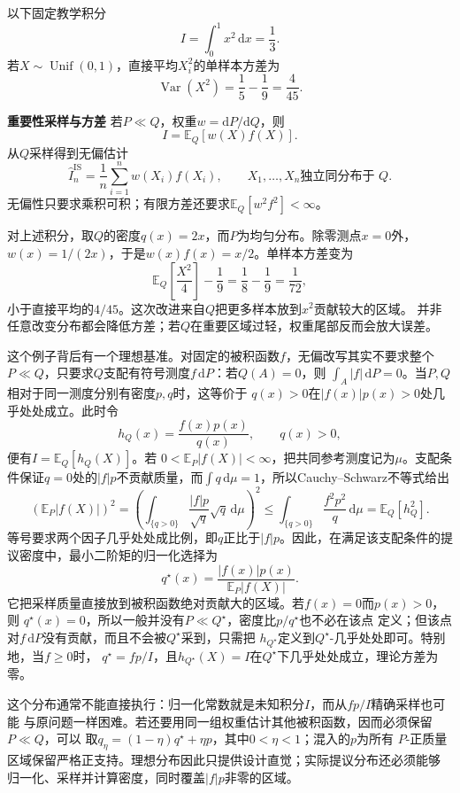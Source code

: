 以下固定教学积分
\[ I=\int_0^1x^2\,\mathrm{d}x=\frac13. \]
若\(X\sim\operatorname{Unif}(0,1)\)，直接平均\(X_i^2\)的单样本方差为
\[ \operatorname{Var}(X^2)
  =\frac15-\frac19=\frac{4}{45}. \]

\par\medskip\noindent\textbf{重要性采样与方差}\quad
若\(P\ll Q\)，权重\(w=\mathrm{d}P/\mathrm{d}Q\)，则
\[ I=\mathbb{E}_Q[w(X)f(X)]. \]
从\(Q\)采样得到无偏估计
\begin{equation}
  \widehat{I}^{\mathrm{IS}}_n
  =
  \frac{1}{n}\sum_{i=1}^{n}w(X_i)f(X_i),
  \qquad X_1,\ldots,X_n\text{独立同分布于 }Q.
  \label{eq:probability-importance-sampling}
\end{equation}
无偏性只要求乘积可积；有限方差还要求\(\mathbb{E}_Q[w^2f^2]<\infty\)。

对上述积分，取\(Q\)的密度\(q(x)=2x\)，而\(P\)为均匀分布。除零测点\(x=0\)外，\(w(x)=1/(2x)\)，于是\(w(x)f(x)=x/2\)。单样本方差变为
\[ \mathbb{E}_Q\left[\frac{X^2}{4}\right]-\frac19
  =\frac18-\frac19=\frac{1}{72}, \]
小于直接平均的\(4/45\)。这次改进来自\(Q\)把更多样本放到\(x^2\)贡献较大的区域。
并非任意改变分布都会降低方差；若\(Q\)在重要区域过轻，权重尾部反而会放大误差。

这个例子背后有一个理想基准。对固定的被积函数\(f\)，无偏改写其实不要求整个
\(P\ll Q\)，只要求\(Q\)支配有符号测度\(f\,\mathrm{d}P\)：若\(Q(A)=0\)，则
\(\int_A|f|\,\mathrm{d}P=0\)。当\(P,Q\)相对于同一测度分别有密度\(p,q\)时，这等价于
\(q(x)>0\)在\(|f(x)|p(x)>0\)处几乎处处成立。此时令
\[
  h_Q(x)=\frac{f(x)p(x)}{q(x)},\qquad q(x)>0,
\]
便有\(I=\mathbb{E}_Q[h_Q(X)]\)。若
\(0<\mathbb{E}_P|f(X)|<\infty\)，把共同参考测度记为\(\mu\)。支配条件保证\(q=0\)处的\(|f|p\)不贡献质量，而\(\int q\,\mathrm d\mu=1\)，所以Cauchy--Schwarz不等式给出
\[
  (\mathbb E_P|f(X)|)^2
  =\left(\int_{\{q>0\}}\frac{|f|p}{\sqrt q}\sqrt q\,\mathrm d\mu\right)^2
  \leq\int_{\{q>0\}}\frac{f^2p^2}{q}\,\mathrm d\mu
  =\mathbb E_Q[h_Q^2].
\]
等号要求两个因子几乎处处成比例，即\(q\)正比于\(|f|p\)。因此，在满足该支配条件的提议密度中，最小二阶矩的归一化选择为
\[
  q^\star(x)
  =
  \frac{|f(x)|p(x)}{\mathbb{E}_P|f(X)|}.
\]
它把采样质量直接放到被积函数绝对贡献大的区域。若\(f(x)=0\)而\(p(x)>0\)，则
\(q^\star(x)=0\)，所以一般并没有\(P\ll Q^\star\)，密度比\(p/q^\star\)也不必在该点
定义；但该点对\(f\,\mathrm{d}P\)没有贡献，而且不会被\(Q^\star\)采到，只需把
\(h_{Q^\star}\)定义到\(Q^\star\)-几乎处处即可。特别地，当\(f\geq0\)时，
\(q^\star=fp/I\)，且\(h_{Q^\star}(X)=I\)在\(Q^\star\)下几乎处处成立，理论方差为零。

这个分布通常不能直接执行：归一化常数就是未知积分\(I\)，而从\(fp/I\)精确采样也可能
与原问题一样困难。若还要用同一组权重估计其他被积函数，因而必须保留\(P\ll Q\)，可以
取\(q_\eta=(1-\eta)q^\star+\eta p\)，其中\(0<\eta<1\)；混入的\(p\)为所有
\(P\)-正质量区域保留严格正支持。理想分布因此只提供设计直觉；实际提议分布还必须能够
归一化、采样并计算密度，同时覆盖\(|f|p\)非零的区域。

